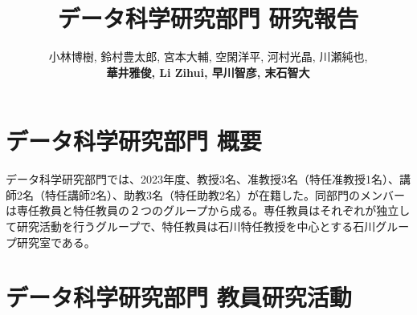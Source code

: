 \documentclass[11pt]{jarticle}
\title{データ科学研究部門 研究報告}
\author{小林博樹, 鈴村豊太郎, 宮本大輔, 空閑洋平, 河村光晶, 川瀬純也, \\
\textbf{華井雅俊, Li Zihui, 早川智彦, 末石智大}}
\begin{document}
\maketitle

\section{データ科学研究部門 概要}
データ科学研究部門では、2023年度、教授3名、准教授3名（特任准教授1名）、講師2名（特任講師2名）、助教3名（特任助教2名）が在籍した。同部門のメンバーは専任教員と特任教員の２つのグループから成る。専任教員はそれぞれが独立して研究活動を行うグループで、特任教員は石川特任教授を中心とする石川グループ研究室である。

%

%

\section{データ科学研究部門 教員研究活動}
\end{document}

